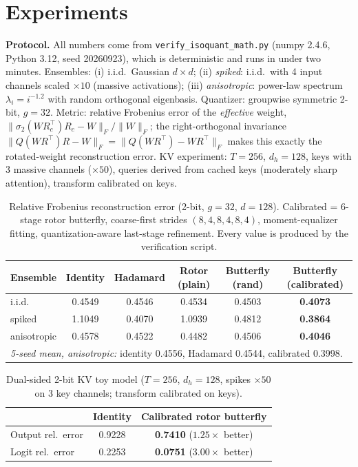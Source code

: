 \documentclass{article}
\newcommand{\norm}[1]{\lVert #1 \rVert}
\begin{document}
\section{Experiments}
\label{sec:results}

\textbf{Protocol.} All numbers come from \texttt{verify\_isoquant\_math.py}
(numpy 2.4.6, Python 3.12, seed 20260923), which is deterministic and runs in
under two minutes. Ensembles: (i) i.i.d.\ Gaussian $d\times d$; (ii)
\emph{spiked}: i.i.d.\ with 4 input channels scaled $\times10$ (massive
activations); (iii) \emph{anisotropic}: power-law spectrum
$\lambda_i=i^{-1.2}$ with random orthogonal eigenbasis. Quantizer:
groupwise symmetric 2-bit, $g=32$. Metric: relative Frobenius error of the
\emph{effective} weight, $\norm{\sigma_2(WR_c^\top)R_c-W}_F/\norm{W}_F$; the
right-orthogonal invariance $\norm{Q(WR^\top)R-W}_F=\norm{Q(WR^\top)-WR^\top}_F$
makes this exactly the rotated-weight reconstruction error. KV experiment:
$T=256$, $d_h=128$, keys with 3 massive channels ($\times50$), queries derived
from cached keys (moderately sharp attention), transform calibrated on keys.

\begin{table}[t]
\centering\small
\caption{Relative Frobenius reconstruction error (2-bit, $g=32$, $d=128$).
Calibrated = 6-stage rotor butterfly, coarse-first strides
$(8,4,8,4,8,4)$, moment-equalizer fitting, quantization-aware last-stage
refinement. Every value is produced by the verification script.}
\label{tab:main}
\begin{tabular}{lccccc}
\toprule
Ensemble & Identity & Hadamard & Rotor (plain) & Butterfly (rand) & Butterfly (calibrated) \\
\midrule
i.i.d.       & 0.4549 & 0.4546 & 0.4534 & 0.4503 & \textbf{0.4073} \\
spiked       & 1.1049 & 0.4070 & 1.0939 & 0.4812 & \textbf{0.3864} \\
anisotropic  & 0.4578 & 0.4522 & 0.4482 & 0.4506 & \textbf{0.4046} \\
\midrule
\multicolumn{6}{l}{\emph{5-seed mean, anisotropic:} identity 0.4556, Hadamard 0.4544, calibrated 0.3998.}\\
\bottomrule
\end{tabular}
\end{table}

\begin{table}[t]
\centering\small
\caption{Dual-sided 2-bit KV toy model ($T=256$, $d_h=128$, spikes
$\times50$ on 3 key channels; transform calibrated on keys).}
\label{tab:kv}
\begin{tabular}{lcc}
\toprule
 & Identity & Calibrated rotor butterfly \\
\midrule
Output rel.\ error & 0.9228 & \textbf{0.7410} ($1.25\times$ better) \\
Logit rel.\ error  & 0.2253 & \textbf{0.0751} ($3.00\times$ better) \\
\bottomrule
\end{tabular}
\end{table}
\end{document}
